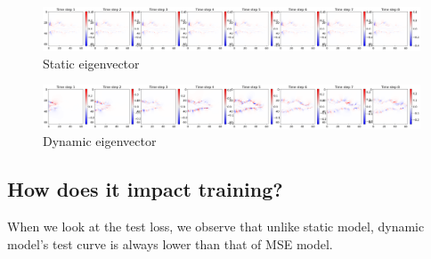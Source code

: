 \documentclass[
]{article}
\begin{document}
\begin{figure}[H]

{\centering \includegraphics[width=1\textwidth,height=\textheight]{../../plot/GCS_channel_plot/training/JAC_0.5/true_eigvec_1.png}

}

\caption{Static eigenvector}

\end{figure}%
\begin{figure}[H]

{\centering \includegraphics[width=1\textwidth,height=\textheight]{../../plot/GCS_channel_plot/training/JAC/true_eigvec_1.png}

}

\caption{Dynamic eigenvector}

\end{figure}%

\subsection{How does it impact
training?}\label{how-does-it-impact-training}

When we look at the test loss, we observe that unlike static model,
dynamic model's test curve is always lower than that of MSE model.
\end{document}
